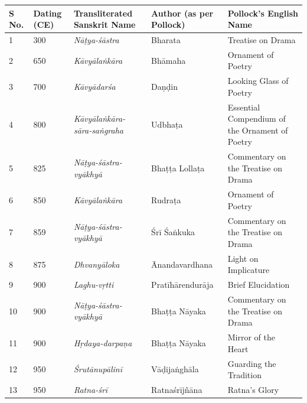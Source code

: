 \begin{longtable}{|l|p{1.1cm}|p{1.98cm}|p{1.98cm}|p{1.98cm}|}
\hline
S No. & Dating (CE) & Transliterated Sanskrit Name & Author (as per Pollock) & Pollock’s English Name \\
\hline
1 & 300 & \textit{Nāṭya-śāstra} & Bharata & Treatise on Drama \\
\hline
2 & 650 & \textit{Kāvyālaṅkāra}\index{Kavyalankara@\textit{Kāvyālaṅkāra}} & Bhāmaha\index{Bhamaha@Bhāmaha} & Ornament of Poetry \\
\hline
3 & 700 & \textit{Kāvyādarśa}\index{Kavyadarsa@\textit{Kāvyādarśa}} & Daṇḍin\index{Dandin@Daṇḍin} & Looking Glass of Poetry \\
\hline
4 & 800 & \textit{Kāvyālaṅkāra-sāra-saṅgraha}\index{Kavyalankarasarasangraha@\textit{Kāvyālaṅkārasāra-saṅgraha}} & Udbhaṭa\index{Udbhata@Udbhaṭa} & Essential Compendium of the Ornament of Poetry \\
\hline
5 & 825 & \textit{Nāṭya-śāstra-vyākhyā}\index{Natyasastravyakhya@\textit{Nāṭya-śāstra-vyākhyā}} & Bhaṭṭa Lollaṭa\index{Bhatta Lollata@Bhaṭṭa Lollaṭa} & Commentary on the Treatise on Drama \\
\hline
6 & 850 & \textit{Kāvyālaṅkāra} & Rudraṭa\index{Rudrata@Rudraṭa} & Ornament of Poetry \\
\hline
7 & 859 & \textit{Nāṭya-śāstra-vyākhyā}\index{Natyasastravyakhya@\textit{Nāṭya-śāstra-vyākhyā}} & Śrī Śaṅkuka\index{Sri Sankuka@Śrī Śaṅkuka} & Commentary on the Treatise on Drama \\
\hline
8 & 875 & \textit{Dhvanyāloka}\index{Dhvanyaloka@\textit{Dhvanyāloka}} & Ānandavar\-dhana\index{Anandavardhana@Ānandavardhana} & Light on Implicature \\
\hline
9 & 900 & \textit{Laghu-vṛtti}\index{Laghuvrtti@\textit{Laghu-vṛtti}} & Pratīhārendu\-rāja\index{Pratiharenduraja@Pratīhārendurāja} & Brief Elucidation \\
\hline
10 & 900 & \textit{Nāṭya-śāstra-vyākhyā}\index{Natyasastravyakhya@\textit{Nāṭya-śāstra-vyākhyā}} & Bhaṭṭa Nāyaka\index{Bhatta Nayaka@Bhaṭṭa Nāyaka} & Commentary on the Treatise on Drama \\
\hline
11 & 900 & \textit{Hṛdaya-darpaṇa}\index{Hrdayadarpana@\textit{Hṛdaya-darpaṇa}} & Bhaṭṭa Nāyaka & Mirror of the Heart \\
\hline
12 & 950 & \textit{Śrutānupālinī}\index{Srutanupalini@\textit{Śrutānupālinī}} & Vāḍijaṅghāla & Guarding the Tradition \\
\hline
13 & 950 & \textit{Ratna-śrī}\index{Ratnasri@\textit{Ratna-śrī}} & Ratnaśrījñāna\index{Ratnasrijnana@Ratnaśrījñāna} & Ratna’s Glory \\

\end{longtable}
